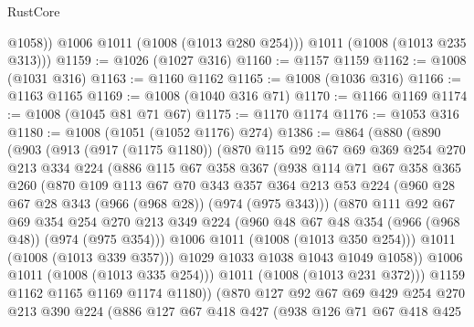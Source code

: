 \begin{lexlean}{RustCore}
\begin{coremodule}
            @1058))
        @1006
        @1011
        (@1008 (@1013 @280 @254)))
      @1011
      (@1008 (@1013 @235 @313)))
@1159 := @1026 (@1027 @316)
@1160 := @1157 @1159
@1162 := @1008 (@1031 @316)
@1163 := @1160 @1162
@1165 := @1008 (@1036 @316)
@1166 := @1163 @1165
@1169 := @1008 (@1040 @316 @71)
@1170 := @1166 @1169
@1174 := @1008 (@1045 @81 @71 @67)
@1175 := @1170 @1174
@1176 := @1053 @316
@1180 := @1008 (@1051 (@1052 @1176) @274)
@1386 := @864
    (@880
      (@890
        (@903
          (@913
            (@917 (@1175 @1180))
            (@870
              @115
              @92
              @67
              @69
              @369
              @254
              @270
              @213
              @334
              @224
              (@886
                @115
                @67
                @358
                @367
                (@938
                  @114
                  @71
                  @67
                  @358
                  @365
                  @260
                  (@870
                    @109
                    @113
                    @67
                    @70
                    @343
                    @357
                    @364
                    @213
                    @53
                    @224
                    (@960 @28 @67 @28 @343 (@966 (@968 @28)) (@974 (@975 @343)))
                    (@870
                      @111
                      @92
                      @67
                      @69
                      @354
                      @254
                      @270
                      @213
                      @349
                      @224
                      (@960 @48 @67 @48 @354 (@966 (@968 @48)) (@974 (@975 @354)))
                      @1006
                      @1011
                      (@1008 (@1013 @350 @254)))
                    @1011
                    (@1008 (@1013 @339 @357)))
                  @1029
                  @1033
                  @1038
                  @1043
                  @1049
                  @1058))
              @1006
              @1011
              (@1008 (@1013 @335 @254)))
            @1011
            (@1008 (@1013 @231 @372)))
          @1159
          @1162
          @1165
          @1169
          @1174
          @1180))
      (@870
        @127
        @92
        @67
        @69
        @429
        @254
        @270
        @213
        @390
        @224
        (@886
          @127
          @67
          @418
          @427
          (@938
            @126
            @71
            @67
            @418
            @425

\end{coremodule}
\end{lexlean}
